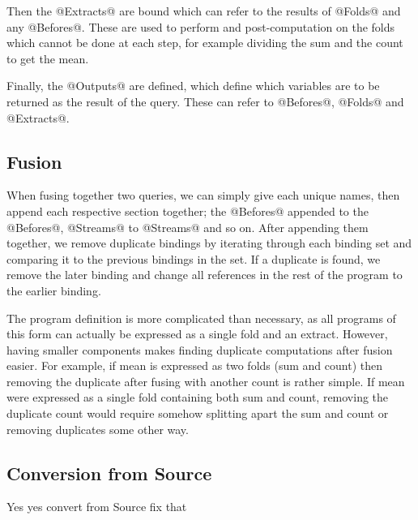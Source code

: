 Then the @Extracts@ are bound which can refer to the results of @Folds@ and any @Befores@.
These are used to perform and post-computation on the folds which cannot be done at each step, for example dividing the sum and the count to get the mean.

Finally, the @Outputs@ are defined, which define which variables are to be returned as the result of the query.
These can refer to @Befores@, @Folds@ and @Extracts@.

\subsection{Fusion}

When fusing together two queries, we can simply give each unique names, then append each respective section together; the @Befores@ appended to the @Befores@, @Streams@ to @Streams@ and so on.
After appending them together, we remove duplicate bindings by iterating through each binding set and comparing it to the previous bindings in the set.
If a duplicate is found, we remove the later binding and change all references in the rest of the program to the earlier binding.

The program definition is more complicated than necessary, as all programs of this form can actually be expressed as a single fold and an extract.
However, having smaller components makes finding duplicate computations after fusion easier.
For example, if mean is expressed as two folds (sum and count) then removing the duplicate after fusing with another count is rather simple.
If mean were expressed as a single fold containing both sum and count, removing the duplicate count would require somehow splitting apart the sum and count or removing duplicates some other way.


\subsection{Conversion from Source}

Yes yes convert from Source fix that



